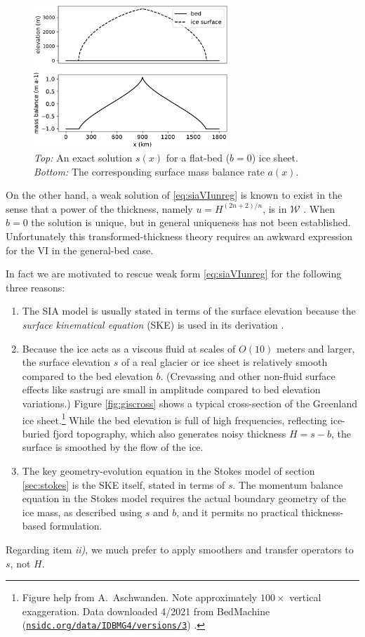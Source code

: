 \documentclass[letterpaper,final,12pt,reqno]{amsart}
\theoremstyle{claim}
\numberwithin{equation}{section}
\numberwithin{figure}{section}
\numberwithin{table}{section}
\numberwithin{theorem}{section}
\begin{document}
\begin{figure}
\includegraphics[width=0.65\textwidth]{fixfigs/siadatafigure.pdf}
\caption{\emph{Top:} An exact solution $s(x)$ for a flat-bed ($b=0$) ice sheet.  \emph{Bottom:} The corresponding surface mass balance rate $a(x)$.}
\label{fig:siadatafigure}
\end{figure}

On the other hand, a weak solution of \eqref{eq:siaVIunreg} is known to exist in the sense that a power of the thickness, namely $u=H^{(2n+2)/n}$, is in $\mathcal{W}$ \cite{JouvetBueler2012}.  When $b=0$ the solution is unique, but in general uniqueness has not been established.  Unfortunately this transformed-thickness theory requires an awkward expression for the VI in the general-bed case.

In fact we are motivated to rescue weak form \eqref{eq:siaVIunreg} for the following three reasons:
\begin{enumerate}
\item The SIA model is usually stated in terms of the surface elevation because the \emph{surface kinematical equation} (SKE) is used in its derivation \cite{GreveBlatter2009}.
\item Because the ice acts as a viscous fluid at scales of $O(10)$ meters and larger, the surface elevation $s$ of a real glacier or ice sheet is relatively smooth compared to the bed elevation $b$.  (Crevassing and other non-fluid surface effects like sastrugi are small in amplitude compared to bed elevation variations.)  Figure \ref{fig:giscross} shows a typical cross-section of the Greenland ice sheet.\footnote{Figure help from A.~Aschwanden.  Note approximately $100\times$ vertical exaggeration.  Data downloaded 4/2021 from BedMachine (\href{https://nsidc.org/data/IDBMG4/versions/3}{\texttt{nsidc.org/data/IDBMG4/versions/3}}) \cite{Morlighemetal2017}.  }  While the bed elevation is full of high frequencies, reflecting ice-buried fjord topography, which also generates noisy thickness $H=s-b$, the surface is smoothed by the flow of the ice.
\item The key geometry-evolution equation in the Stokes model of section \ref{sec:stokes} is the SKE itself, stated in terms of $s$.  The momentum balance equation in the Stokes model requires the actual boundary geometry of the ice mass, as described using $s$ and $b$, and it permits no practical thickness-based formulation.
\end{enumerate}
Regarding item \emph{ii)}, we much prefer to apply smoothers and transfer operators to $s$, not $H$.
\end{document}
